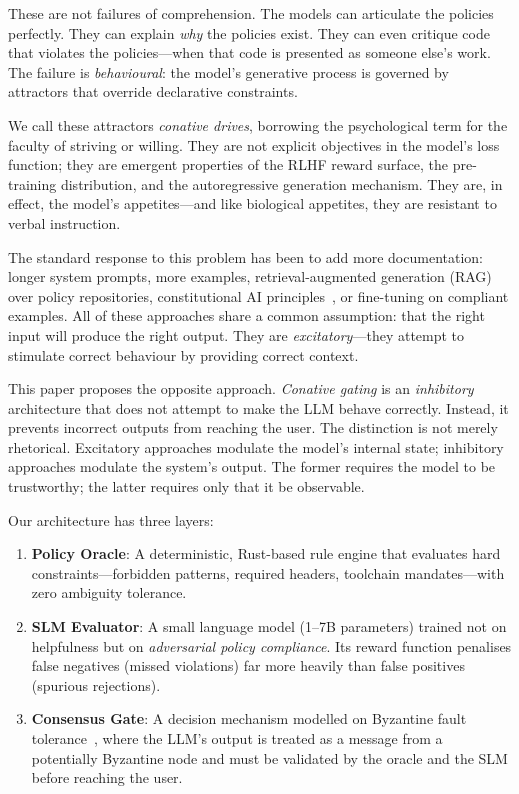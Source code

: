 \documentclass[11pt,a4paper]{article}
\begin{document}
These are not failures of comprehension.  The models can articulate
the policies perfectly.  They can explain \emph{why} the policies exist.
They can even critique code that violates the policies---when that
code is presented as someone else's work.  The failure is
\emph{behavioural}: the model's generative process is governed by
attractors that override declarative constraints.

We call these attractors \emph{conative drives}, borrowing the
psychological term for the faculty of striving or willing.  They are
not explicit objectives in the model's loss function; they are emergent
properties of the RLHF reward surface, the pre-training distribution,
and the autoregressive generation mechanism.  They are, in effect,
the model's appetites---and like biological appetites, they are
resistant to verbal instruction.

The standard response to this problem has been to add more
documentation: longer system prompts, more examples, retrieval-augmented
generation (RAG) over policy repositories, constitutional AI
principles~\citep{bai2022constitutional}, or fine-tuning on compliant examples.
All of these approaches share a common assumption: that the right input
will produce the right output.  They are \emph{excitatory}---they attempt
to stimulate correct behaviour by providing correct context.

This paper proposes the opposite approach.  \emph{Conative gating} is an
\emph{inhibitory} architecture that does not attempt to make the LLM
behave correctly.  Instead, it prevents incorrect outputs from reaching
the user.  The distinction is not merely rhetorical.  Excitatory
approaches modulate the model's internal state; inhibitory approaches
modulate the system's output.  The former requires the model to be
trustworthy; the latter requires only that it be observable.

Our architecture has three layers:

\begin{enumerate}[label=\textbf{L\arabic*},leftmargin=2em]
  \item \textbf{Policy Oracle}: A deterministic, Rust-based rule engine
        that evaluates hard constraints---forbidden patterns, required
        headers, toolchain mandates---with zero ambiguity tolerance.
  \item \textbf{SLM Evaluator}: A small language model (1--7B parameters)
        trained not on helpfulness but on \emph{adversarial policy
        compliance}.  Its reward function penalises false negatives
        (missed violations) far more heavily than false positives
        (spurious rejections).
  \item \textbf{Consensus Gate}: A decision mechanism modelled on
        Byzantine fault tolerance~\citep{lamport1982byzantine}, where the
        LLM's output is treated as a message from a potentially
        Byzantine node and must be validated by the oracle and the SLM
        before reaching the user.
\end{enumerate}
\end{document}
